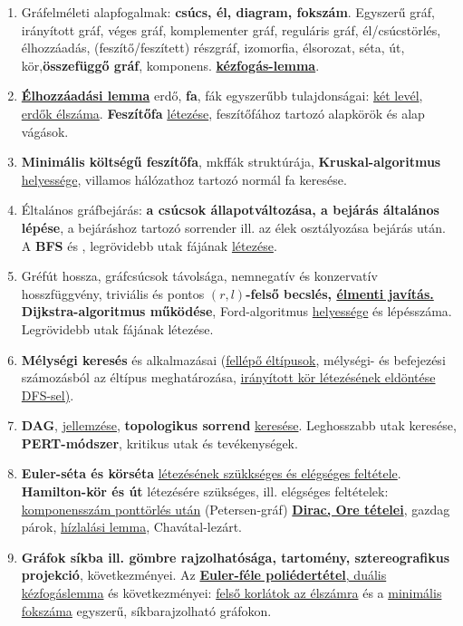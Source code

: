 \documentclass[10pt]{article}
\begin{document}
        \begin{enumerate}
            \item Gráfelméleti alapfogalmak: \textbf{csúcs, él, diagram, fokszám}. Egyszerű gráf, irányított gráf, véges gráf, komplementer gráf, reguláris gráf, él/csúcstörlés, élhozzáadás, (feszítő/feszített) részgráf, izomorfia, élsorozat, séta, út, kör,\textbf{összefüggő gráf}, komponens. \underline{\textbf{kézfogás-lemma}}.
            \item \underline{\textbf{Élhozzáadási lemma}} erdő, \textbf{fa}, fák egyszerűbb tulajdonságai: \underline{két levél}, \underline{erdők élszáma}. \textbf{Feszítőfa} \underline{létezése}, feszítőfához tartozó alapkörök és alap vágások.
            \item \textbf{Minimális költségű feszítőfa}, mkffák struktúrája, \textbf{Kruskal-algoritmus} \underline{helyessége}, villamos hálózathoz tartozó normál fa keresése.
            \item Éltalános gráfbejárás: \textbf{a csúcsok állapotváltozása, a bejárás általános lépése}, a bejáráshoz tartozó sorrender ill. az élek osztályozása bejárás után. A \textbf{BFS} és , legrövidebb utak fájának \underline{létezése}.
            \item Gréfút hossza, gráfcsúcsok távolsága, nemnegatív és konzervatív hosszfüggvény, triviális és pontos $(r,l)$\textbf{-felső becslés, \underline{élmenti javítás.} Dijkstra-algoritmus működése}, Ford-algoritmus \underline{helyessége} és lépésszáma. Legrövidebb utak fájának létezése.
            \item \textbf{Mélységi keresés} és alkalmazásai (\underline{fellépő éltípusok}, mélységi- és befejezési számozásból az éltípus meghatározása, \underline{irányított kör létezésének eldöntése DFS-sel)}.
            \item \textbf{DAG}, \underline{jellemzése}, \textbf{topologikus sorrend} \underline{keresése}. Leghosszabb utak keresése, \textbf{PERT-módszer}, kritikus utak és tevékenységek.
            \item \textbf{Euler-séta és körséta} \underline{létezésének szükkséges és elégséges feltétele}. \textbf{Hamilton-kör és út} létezésére szükséges, ill. elégséges feltételek: \underline{komponensszám ponttörlés után} (Petersen-gráf) \underline{\textbf{Dirac, Ore tételei}}, gazdag párok, \underline{hízlalási lemma}, Chavátal-lezárt.
            \item \textbf{Gráfok síkba ill. gömbre rajzolhatósága, tartomény, sztereografikus projekció}, következményei. Az \underline{\textbf{Euler-féle poliédertétel}, duális kézfogáslemma} és következményei: \underline{felső korlátok az élszámra} és a \underline{minimális fokszáma} egyszerű, síkbarajzolható gráfokon.

\end{enumerate}
\end{document}
